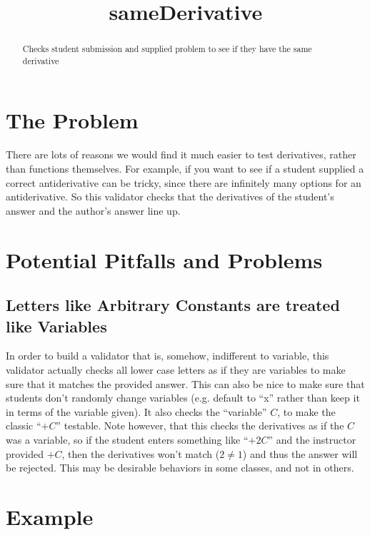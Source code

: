 \documentclass{ximera}
\title{sameDerivative}
\begin{document}
\begin{abstract}
    Checks student submission and supplied problem to see if they have the same derivative
\end{abstract}
\maketitle


\section{The Problem}

    There are lots of reasons we would find it much easier to test derivatives, rather than functions themselves. For example, if you want to see if a student supplied a correct antiderivative can be tricky, since there are infinitely many options for an antiderivative. So this validator checks that the derivatives of the student's answer and the author's answer line up.

\section{Potential Pitfalls and Problems}
    
    \subsection{Letters like Arbitrary Constants are treated like Variables}
        In order to build a validator that is, somehow, indifferent to variable, this validator actually checks all lower case letters as if they are variables to make sure that it matches the provided answer. This can also be nice to make sure that students don't randomly change variables (e.g. default to ``x'' rather than keep it in terms of the variable given). It also checks the ``variable'' $C$, to make the classic ``$+C$'' testable. Note however, that this checks the derivatives as if the $C$ was a variable, so if the student enters something like ``$+2C$'' and the instructor provided $+C$, then the derivatives won't match ($2\neq 1$) and thus the answer will be rejected. This may be desirable behaviors in some classes, and not in others.


\section{Example}
\end{document}

